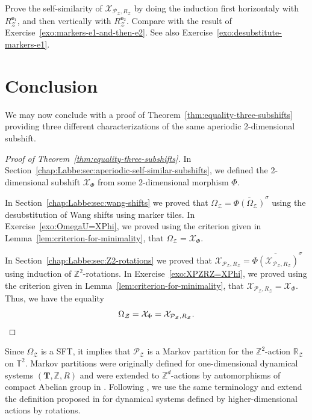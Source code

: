 \documentclass[12pt]{amsart}
\newcommand{\Z}{\mathbb{Z}}
\newcommand{\R}{\mathbb{R}}
\newcommand{\be}{{\boldsymbol{e}}}
\newcommand{\Pcal}{\mathcal{P}}
\newcommand{\Xcal}{\mathcal{X}} %
\newcommand{\Zcal}{\mathcal{Z}}
\newcommand{\shiftclosure}[1]{{\overline{#1}^{\sigma}}}
\newcommand{\generictorus}{{\boldsymbol{T}}}
\newcommand{\torus}{\mathbb{T}}
\begin{document}
\begin{exo}[label={exo:induction-first-horizontal}]
    Prove the self-similarity of $\Xcal_{\Pcal_\Zcal,R_\Zcal}$ 
    by doing the induction first horizontaly with $R_\Zcal^{\be_1}$, 
    and then vertically with $R_\Zcal^{\be_2}$.
    Compare with the result of Exercise~\ref{exo:markers-e1-and-then-e2}.
    See also Exercise~\ref{exo:desubstitute-markers-e1}.
\end{exo}







\section{Conclusion}

We may now conclude with a proof of Theorem~\ref{thm:equality-three-subshifts}
providing three different characterizations of the same aperiodic 2-dimensional
subshift.

\begin{proof}[Proof of Theorem~\ref{thm:equality-three-subshifts}]
In Section~\ref{chap:Labbe:sec:aperiodic-self-similar-subshifts},
we defined the 2-dimensional subshift $\Xcal_\Phi$ from some 2-dimensional
morphism $\Phi$.

In Section~\ref{chap:Labbe:sec:wang-shifts}
we proved that
$\Omega_\Zcal=\shiftclosure{\Phi(\Omega_\Zcal)}$ using the desubstitution of
Wang shifts using marker tiles.
In Exercise~\ref{exo:OmegaU=XPhi}, we proved using the criterion 
given in Lemma~\ref{lem:criterion-for-minimality}, that
$\Omega_\Zcal=\Xcal_\Phi$.

In Section~\ref{chap:Labbe:sec:Z2-rotations}
we proved that
$\Xcal_{\Pcal_\Zcal,R_\Zcal}=\shiftclosure{\Phi(\Xcal_{\Pcal_\Zcal,R_\Zcal})}$ using
induction of $\Z^2$-rotations.
In Exercise~\ref{exo:XPZRZ=XPhi}, we proved using the criterion 
given in Lemma~\ref{lem:criterion-for-minimality}, that
$\Xcal_{\Pcal_\Zcal,R_\Zcal}=\Xcal_\Phi$.
Thus, we have the equality
\[
\Omega_\Zcal
=\Xcal_\Phi
=\Xcal_{\Pcal_\Zcal,R_\Zcal}.\qedhere
\]
\end{proof}


Since $\Omega_\Zcal$ is a SFT,
it implies that
$\Pcal_\Zcal$ is a Markov partition
for the $\Z^2$-action $\R_\Zcal$ on $\torus^2$.
Markov partitions were originally defined for one-dimensional dynamical
systems $(\generictorus,\Z,R)$ and were extended to $\Z^d$-actions by automorphisms of
compact Abelian group in \cite{MR1632169}.
Following \cite{MR4213162},
we use the same terminology 
and extend the definition proposed in \cite[\S 6.5]{MR1369092}
for dynamical systems defined by higher-dimensional actions by rotations.
\end{document}
